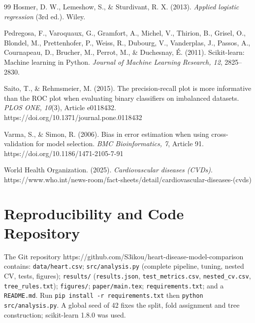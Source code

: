 \documentclass[12pt,a4paper]{article}
\newcommand{\code}[1]{\texttt{\small #1}}
\begin{document}
\begin{thebibliography}{99}
Hosmer, D. W., Lemeshow, S., \& Sturdivant, R. X. (2013). \emph{Applied logistic regression} (3rd ed.). Wiley.

Pedregosa, F., Varoquaux, G., Gramfort, A., Michel, V., Thirion, B., Grisel, O., Blondel, M., Prettenhofer, P., Weiss, R., Dubourg, V., Vanderplas, J., Passos, A., Cournapeau, D., Brucher, M., Perrot, M., \& Duchesnay, {\'E}. (2011). Scikit-learn: Machine learning in Python. \emph{Journal of Machine Learning Research, 12}, 2825--2830.

Saito, T., \& Rehmsmeier, M. (2015). The precision-recall plot is more informative than the ROC plot when evaluating binary classifiers on imbalanced datasets. \emph{PLOS ONE, 10}(3), Article e0118432. https://doi.org/10.1371/journal.pone.0118432

Varma, S., \& Simon, R. (2006). Bias in error estimation when using cross-validation for model selection. \emph{BMC Bioinformatics, 7}, Article 91. https://doi.org/10.1186/1471-2105-7-91

World Health Organization. (2025). \emph{Cardiovascular diseases (CVDs)}. https://www.who.int/news-room/fact-sheets/detail/cardiovascular-diseases-(cvds)

\end{thebibliography}

\newpage
\appendix
\section{Reproducibility and Code Repository}
The Git repository https://github.com/S3ikou/heart-disease-model-comparison contains: \code{data/heart.csv}; \code{src/analysis.py} (complete pipeline, tuning, nested CV, tests, figures); \code{results/} (\code{results.json}, \code{test\_metrics.csv}, \code{nested\_cv.csv}, \code{tree\_rules.txt}); \code{figures/}; \code{paper/main.tex}; \code{requirements.txt}; and a \code{README.md}. Run \code{pip install -r requirements.txt} then \code{python src/analysis.py}. A global seed of 42 fixes the split, fold assignment and tree construction; scikit-learn 1.8.0 was used.
\end{document}
